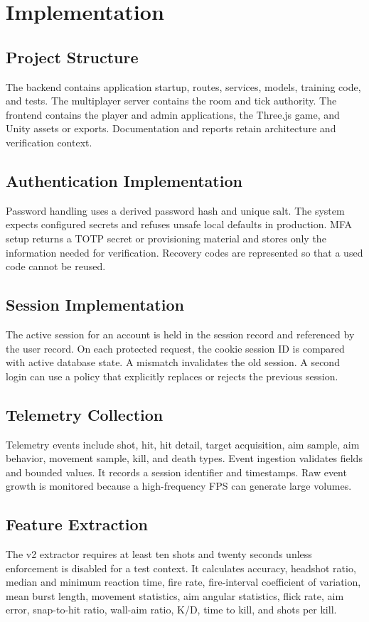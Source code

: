 \documentclass[12pt,a4paper,oneside]{report}
\begin{document}
\chapter{Implementation}
\section{Project Structure}
The backend contains application startup, routes, services, models, training code, and tests. The multiplayer server contains the room and tick authority. The frontend contains the player and admin applications, the Three.js game, and Unity assets or exports. Documentation and reports retain architecture and verification context.

\section{Authentication Implementation}
Password handling uses a derived password hash and unique salt. The system expects configured secrets and refuses unsafe local defaults in production. MFA setup returns a TOTP secret or provisioning material and stores only the information needed for verification. Recovery codes are represented so that a used code cannot be reused.

\section{Session Implementation}
The active session for an account is held in the session record and referenced by the user record. On each protected request, the cookie session ID is compared with active database state. A mismatch invalidates the old session. A second login can use a policy that explicitly replaces or rejects the previous session.

\section{Telemetry Collection}
Telemetry events include shot, hit, hit detail, target acquisition, aim sample, aim behavior, movement sample, kill, and death types. Event ingestion validates fields and bounded values. It records a session identifier and timestamps. Raw event growth is monitored because a high-frequency FPS can generate large volumes.

\section{Feature Extraction}
The v2 extractor requires at least ten shots and twenty seconds unless enforcement is disabled for a test context. It calculates accuracy, headshot ratio, median and minimum reaction time, fire rate, fire-interval coefficient of variation, mean burst length, movement statistics, aim angular statistics, flick rate, aim error, snap-to-hit ratio, wall-aim ratio, K/D, time to kill, and shots per kill.
\end{document}
